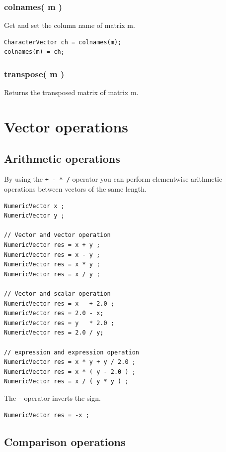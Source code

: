 \documentclass[]{book}
\theoremstyle{definition}
\theoremstyle{definition}
\theoremstyle{remark}
\begin{document}
\subsection{colnames( m )}\label{colnames-m}

Get and set the column name of matrix m.

\begin{verbatim}
CharacterVector ch = colnames(m);
colnames(m) = ch;
\end{verbatim}

\subsection{transpose( m )}\label{transpose-m}

Returns the transposed matrix of matrix m.

\chapter{Vector operations}\label{vector-operations}

\section{Arithmetic operations}\label{arithmetic-operations}

By using the \texttt{+\ -\ *\ /} operator you can perform elementwise
arithmetic operations between vectors of the same length.

\begin{verbatim}
NumericVector x ;
NumericVector y ;

// Vector and vector operation
NumericVector res = x + y ;
NumericVector res = x - y ;
NumericVector res = x * y ;
NumericVector res = x / y ;

// Vector and scalar operation
NumericVector res = x   + 2.0 ;
NumericVector res = 2.0 - x;
NumericVector res = y   * 2.0 ;
NumericVector res = 2.0 / y;

// expression and expression operation
NumericVector res = x * y + y / 2.0 ;
NumericVector res = x * ( y - 2.0 ) ;
NumericVector res = x / ( y * y ) ;
\end{verbatim}

The \texttt{-} operator inverts the sign.

\begin{verbatim}
NumericVector res = -x ;
\end{verbatim}

\section{Comparison operations}\label{comparison-operations}
\end{document}
